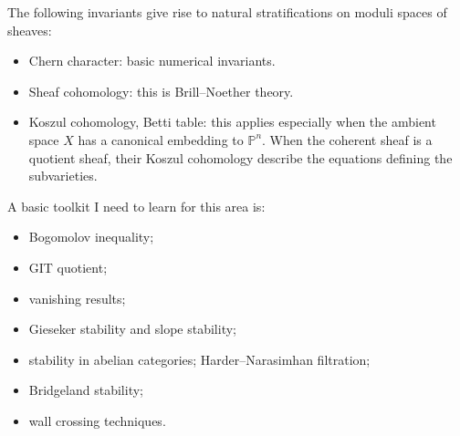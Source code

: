 The following invariants give rise to natural stratifications on moduli spaces of sheaves:
\begin{itemize}
\item Chern character: basic numerical invariants.
\item Sheaf cohomology: this is Brill--Noether theory.
\item Koszul cohomology, Betti table: this applies especially when the ambient space $X$ has a canonical embedding to $\mathbb{P}^n$. When the coherent sheaf is a quotient sheaf, their Koszul cohomology describe the equations defining the subvarieties.
\end{itemize}

A basic toolkit I need to learn for this area is:
\begin{itemize}
\item Bogomolov inequality;
\item GIT quotient;
\item vanishing results;
\item Gieseker stability and slope stability;
\item stability in abelian categories; Harder--Narasimhan filtration;
\item Bridgeland stability;
\item wall crossing techniques.
\end{itemize}

